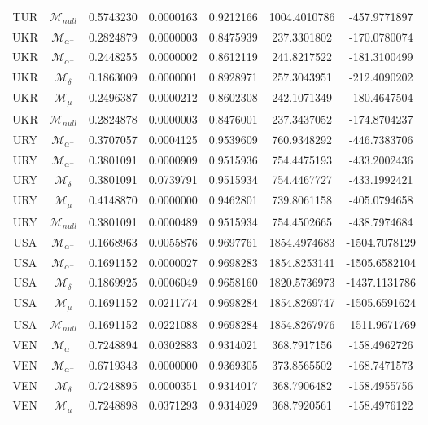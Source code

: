 \begin{tabular}{ccccccc}
TUR & $\mathcal{M}_{null}$ & 0.5743230 & 0.0000163 & 0.9212166 & 1004.4010786 & -457.9771897\\
UKR & $\mathcal{M}_{\alpha^+}$ & 0.2824879 & 0.0000003 & 0.8475939 & 237.3301802 & -170.0780074\\
UKR & $\mathcal{M}_{\alpha^-}$ & 0.2448255 & 0.0000002 & 0.8612119 & 241.8217522 & -181.3100499\\
UKR & $\mathcal{M}_{\delta}$ & 0.1863009 & 0.0000001 & 0.8928971 & 257.3043951 & -212.4090202\\
UKR & $\mathcal{M}_{\mu}$ & 0.2496387 & 0.0000212 & 0.8602308 & 242.1071349 & -180.4647504\\
UKR & $\mathcal{M}_{null}$ & 0.2824878 & 0.0000003 & 0.8476001 & 237.3437052 & -174.8704237\\
URY & $\mathcal{M}_{\alpha^+}$ & 0.3707057 & 0.0004125 & 0.9539609 & 760.9348292 & -446.7383706\\
URY & $\mathcal{M}_{\alpha^-}$ & 0.3801091 & 0.0000909 & 0.9515936 & 754.4475193 & -433.2002436\\
URY & $\mathcal{M}_{\delta}$ & 0.3801091 & 0.0739791 & 0.9515934 & 754.4467727 & -433.1992421\\
URY & $\mathcal{M}_{\mu}$ & 0.4148870 & 0.0000000 & 0.9462801 & 739.8061158 & -405.0794658\\
URY & $\mathcal{M}_{null}$ & 0.3801091 & 0.0000489 & 0.9515934 & 754.4502665 & -438.7974684\\
USA & $\mathcal{M}_{\alpha^+}$ & 0.1668963 & 0.0055876 & 0.9697761 & 1854.4974683 & -1504.7078129\\
USA & $\mathcal{M}_{\alpha^-}$ & 0.1691152 & 0.0000027 & 0.9698283 & 1854.8253141 & -1505.6582104\\
USA & $\mathcal{M}_{\delta}$ & 0.1869925 & 0.0006049 & 0.9658160 & 1820.5736973 & -1437.1131786\\
USA & $\mathcal{M}_{\mu}$ & 0.1691152 & 0.0211774 & 0.9698284 & 1854.8269747 & -1505.6591624\\
USA & $\mathcal{M}_{null}$ & 0.1691152 & 0.0221088 & 0.9698284 & 1854.8267976 & -1511.9671769\\
VEN & $\mathcal{M}_{\alpha^+}$ & 0.7248894 & 0.0302883 & 0.9314021 & 368.7917156 & -158.4962726\\
VEN & $\mathcal{M}_{\alpha^-}$ & 0.6719343 & 0.0000000 & 0.9369305 & 373.8565502 & -168.7471573\\
VEN & $\mathcal{M}_{\delta}$ & 0.7248895 & 0.0000351 & 0.9314017 & 368.7906482 & -158.4955756\\
VEN & $\mathcal{M}_{\mu}$ & 0.7248898 & 0.0371293 & 0.9314029 & 368.7920561 & -158.4976122\\

\end{tabular}
